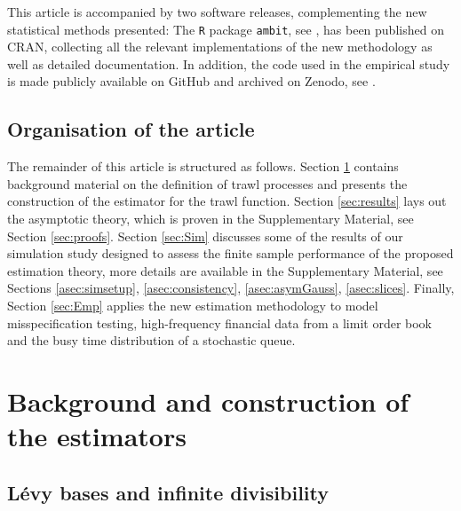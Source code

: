 \documentclass{article}
\theoremstyle{plain}
\theoremstyle{definition}
\theoremstyle{remark}
\newcommand{\Levy}{L\'{e}vy }
\begin{document}
This article is accompanied by two software releases, complementing the new statistical methods presented: 
The {\tt R} package {\tt ambit}, see \cite{ambit},
has been published on CRAN, collecting all the relevant implementations of the new methodology as well as detailed documentation. In addition, the code used in the empirical study is made publicly available on GitHub 
and archived on Zenodo, see \cite{emp-code-trawl}.



\subsection{Organisation of the article}

The remainder of this article is structured as follows.
Section \ref{sec:background} contains background material on the definition of trawl processes and presents the construction of the estimator for the trawl function.
Section \ref{sec:results} lays out the asymptotic theory, which is proven in the Supplementary Material, see  Section \ref{sec:proofs}.
Section \ref{sec:Sim} discusses some of the results of our simulation study designed to assess the finite sample performance of the proposed estimation theory, more details are available in  the Supplementary Material, see Sections \ref{asec:simsetup}, \ref{asec:consistency},  \ref{asec:asymGauss}, \ref{asec:slices}.
Finally, Section 
\ref{sec:Emp} applies the new estimation methodology to model misspecification testing, high-frequency financial data from a limit order book and the busy time distribution of a stochastic queue.





\section{Background and construction of the estimators}\label{sec:background}


\subsection{\Levy bases and infinite divisibility}
\end{document}
